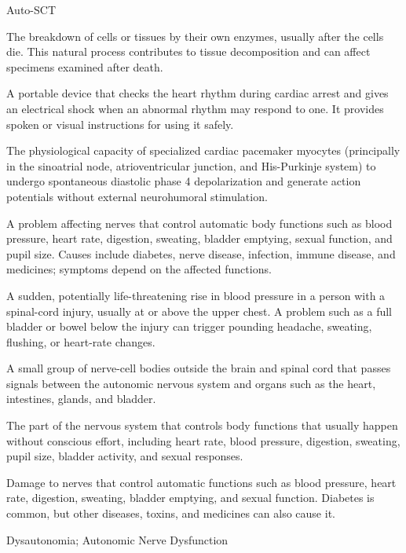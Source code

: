 \synonyms
Auto-SCT

 The breakdown of cells or tissues by their own enzymes, usually after the cells die. This natural process contributes to tissue decomposition and can affect specimens examined after death.

 A portable device that checks the heart rhythm during cardiac arrest and gives an electrical shock when an abnormal rhythm may respond to one. It provides spoken or visual instructions for using it safely.

 The physiological capacity of specialized cardiac pacemaker myocytes (principally in the sinoatrial node, atrioventricular junction, and His-Purkinje system) to undergo spontaneous diastolic phase 4 depolarization and generate action potentials without external neurohumoral stimulation.

 A problem affecting nerves that control automatic body functions such as blood pressure, heart rate, digestion, sweating, bladder emptying, sexual function, and pupil size. Causes include diabetes, nerve disease, infection, immune disease, and medicines; symptoms depend on the affected functions.

 A sudden, potentially life-threatening rise in blood pressure in a person with a spinal-cord injury, usually at or above the upper chest. A problem such as a full bladder or bowel below the injury can trigger pounding headache, sweating, flushing, or heart-rate changes.

 A small group of nerve-cell bodies outside the brain and spinal cord that passes signals between the autonomic nervous system and organs such as the heart, intestines, glands, and bladder.

 The part of the nervous system that controls body functions that usually happen without conscious effort, including heart rate, blood pressure, digestion, sweating, pupil size, bladder activity, and sexual responses.

 Damage to nerves that control automatic functions such as blood pressure, heart rate, digestion, sweating, bladder emptying, and sexual function. Diabetes is common, but other diseases, toxins, and medicines can also cause it.

\synonyms
Dysautonomia; Autonomic Nerve Dysfunction

